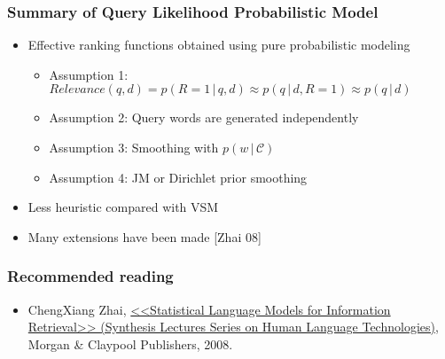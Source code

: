 \subsubsection{Summary of Query Likelihood Probabilistic Model}
\begin{itemize}
\item Effective ranking functions obtained using pure probabilistic modeling

\begin{itemize}
\item Assumption 1: $Relevance(q,d) = p(R=1 \,\big|\, q,d) \approx p(q \,\big|\, d,R=1) \approx p(q \,\big|\, d)$
\item Assumption 2: Query words are generated independently
\item Assumption 3: Smoothing with $p(w \,\big|\, \mathcal{C})$
\item Assumption 4: JM or Dirichlet prior smoothing
\end{itemize}

\item Less heuristic compared with VSM
\item Many extensions have been made [Zhai 08]
\end{itemize}

\subsubsection{Recommended reading}
\begin{itemize}
\item ChengXiang Zhai, \href{http://www.morganclaypool.com/doi/abs/10.2200/S00158ED1V01Y200811HLT001}{<<Statistical Language Models for Information Retrieval>> (Synthesis Lectures Series on Human Language Technologies)}, Morgan \& Claypool Publishers, 2008.
\end{itemize}


